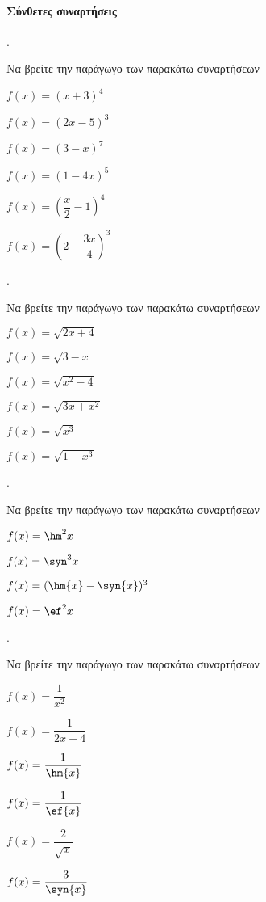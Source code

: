 \documentclass[11pt,a4paper,twocolumn]{article}
\newcounter{askhsh}
\newcommand{\askhsh}{{\large\theaskhsh.}\ \addtocounter{askhsh}{1}}
\begin{document}
\paragraph{Σύνθετες συναρτήσεις}
\askhsh Να βρείτε την παράγωγο των παρακάτω συναρτήσεων
\begin{multicols}{2}
\begin{alist}
\item $ f(x)=(x+3)^4 $
\item $ f(x)=(2x-5)^3 $
\item $ f(x)=(3-x)^7 $
\item $ f(x)=(1-4x)^5 $
\item $ f(x)=\left(\dfrac{x}{2}-1\right)^4 $
\item $ f(x)=\left(2-\dfrac{3x}{4}\right)^3 $
\end{alist}
\end{multicols}
\askhsh Να βρείτε την παράγωγο των παρακάτω συναρτήσεων
\begin{multicols}{2}
\begin{alist}
\item $ f(x)=\sqrt{2x+4} $
\item $ f(x)=\sqrt{3-x} $
\item $ f(x)=\sqrt{x^2-4} $
\item $ f(x)=\sqrt{3x+x^2} $
\item $ f(x)=\sqrt{x^3} $
\item $ f(x)=\sqrt{1-x^3} $
\end{alist}
\end{multicols}
\askhsh Να βρείτε την παράγωγο των παρακάτω συναρτήσεων
\begin{alist}
\item $ f(x)=\hm^2{x} $
\item $ f(x)=\syn^3{x} $
\item $ f(x)=(\hm{x}-\syn{x})^3 $
\item $ f(x)=\ef^2{x} $
\end{alist}
\askhsh Να βρείτε την παράγωγο των παρακάτω συναρτήσεων
\begin{multicols}{2}
\begin{alist}
\item $ f(x)=\dfrac{1}{x^2} $
\item $ f(x)=\dfrac{1}{2x-4} $
\item $ f(x)=\dfrac{1}{\hm{x}} $
\item $ f(x)=\dfrac{1}{\ef{x}} $
\item $ f(x)=\dfrac{2}{\sqrt{x}} $
\item $ f(x)=\dfrac{3}{\syn{x}} $
\end{alist}
\end{multicols}
\end{document}
